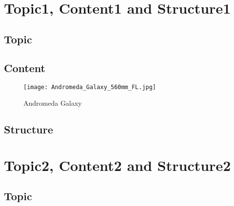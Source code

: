 \documentclass[12pt, a4paper]{article}
\begin{document}
\nocite{*}



\tableofcontents
\newpage
{}
\setcounter{lastroman}{\value{page}}
\maketitle
\begin{abstract}
    \lipsum[20]
\end{abstract}
\section{Topic1, Content1 and Structure1}
\subsection{Topic}
\lipsum[10]
\subsection{Content}
\lipsum[15]
\begin{figure}[h]
    \centering
    \texttt{[image: Andromeda\_Galaxy\_560mm\_FL.jpg]}\label{fig::andromeda}
    \caption{Andromeda Galaxy}
\end{figure}
\subsection{Structure}
\lipsum[20]
\section{Topic2, Content2 and Structure2}
\subsection{Topic}
\lipsum[25]
\end{document}
